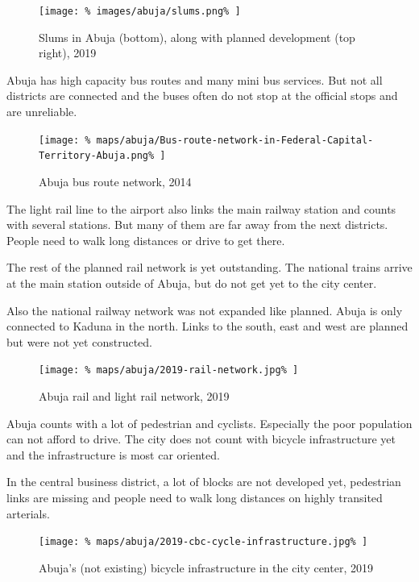 \documentclass[twocolumn]{article}
\begin{document}
			\begin{figure}[H]
				\texttt{[image: \%
					images/abuja/slums.png\%
				]}
				\caption{Slums in Abuja (bottom), along with planned development (top right), 2019\cite{Satellites.pro:Abuja}}
				\label{fig:images:abuja-slums}
			\end{figure}
			
			Abuja has high capacity bus routes and many mini bus services. But not all districts are connected and the buses often do not stop at the official stops and are unreliable.
			
			\begin{figure}[H]
				\texttt{[image: \%
					maps/abuja/Bus-route-network-in-Federal-Capital-Territory-Abuja.png\%
				]}
				\caption{Abuja bus route network, 2014\cite{ResearchGate:AbujaBusRouteNetwork}}
				\label{fig:map:abuja-bus-route-network}
			\end{figure}
			
			The light rail line to the airport also links the main railway station and counts with several stations. But many of them are far away from the next districts. People need to walk long distances or drive to get there.
			
			The rest of the planned rail network is yet outstanding. The national trains arrive at the main station outside of Abuja, but do not get yet to the city center.
			
			Also the national railway network was not expanded like planned. Abuja is only connected to Kaduna in the north. Links to the south, east and west are planned but were not yet constructed.
			
			\begin{figure}[H]
				\texttt{[image: \%
					maps/abuja/2019-rail-network.jpg\%
				]}
				\caption{Abuja rail and light rail network, 2019\cite{ResearchGate:AbujaBusRouteNetwork}}
				\label{fig:map:abuja-rail-network-2019}
			\end{figure}
			
			Abuja counts with a lot of pedestrian and cyclists. Especially the poor population can not afford to drive.
			The city does not count with bicycle infrastructure yet and the infrastructure is most car oriented.
			
			In the central business district, a lot of blocks are not developed yet, pedestrian links are missing and people need to walk long distances on highly transited arterials.
			
			\begin{figure}[H]
				\texttt{[image: \%
					maps/abuja/2019-cbc-cycle-infrastructure.jpg\%
				]}
				\caption{Abuja's (not existing) bicycle infrastructure in the city center, 2019\cite{OpenCycleMap:Abuja}}
				\label{fig:map:abuja-bicycle-map-2019}
			\end{figure}	
			
\end{document}

